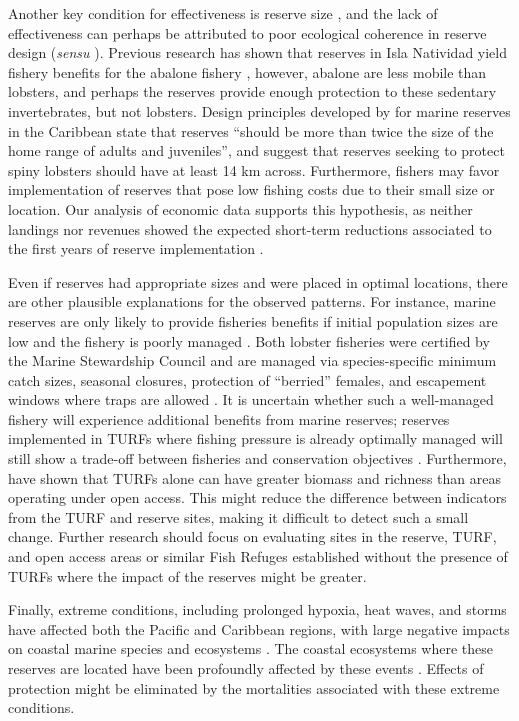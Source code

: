 \documentclass{frontiersSCNS}
\begin{document}
Another key condition for effectiveness is reserve size
\citep{edgar_2014-UO}, and the lack of effectiveness can perhaps be
attributed to poor ecological coherence in reserve design (\emph{sensu}
\citet{rees_2018}). Previous research has shown that reserves in Isla
Natividad yield fishery benefits for the abalone fishery
\citep{rossetto_2015-V0}, however, abalone are less mobile than
lobsters, and perhaps the reserves provide enough protection to these
sedentary invertebrates, but not lobsters. Design principles developed
by \citet{green_2017} for marine reserves in the Caribbean state that
reserves ``should be more than twice the size of the home range of
adults and juveniles'', and suggest that reserves seeking to protect
spiny lobsters should have at least 14 km across. Furthermore, fishers
may favor implementation of reserves that pose low fishing costs due to
their small size or location. Our analysis of economic data supports
this hypothesis, as neither landings nor revenues showed the expected
short-term reductions associated to the first years of reserve
implementation \citep{ovando_2016-Wg}.

Even if reserves had appropriate sizes and were placed in optimal
locations, there are other plausible explanations for the observed
patterns. For instance, marine reserves are only likely to provide
fisheries benefits if initial population sizes are low and the fishery
is poorly managed \citep{hilborn_2004,hilborn_2006}. Both lobster
fisheries were certified by the Marine Stewardship Council and are
managed via species-specific minimum catch sizes, seasonal closures,
protection of ``berried'' females, and escapement windows where traps
are allowed \citep{dof_website_1993}. It is uncertain whether such a
well-managed fishery will experience additional benefits from marine
reserves; reserves implemented in TURFs where fishing pressure is
already optimally managed will still show a trade-off between fisheries
and conservation objectives \citep{lester_2017}. Furthermore,
\citet{gelcich_2008} have shown that TURFs alone can have greater
biomass and richness than areas operating under open access. This might
reduce the difference between indicators from the TURF and reserve
sites, making it difficult to detect such a small change. Further
research should focus on evaluating sites in the reserve, TURF, and open
access areas or similar Fish Refuges established without the presence of
TURFs where the impact of the reserves might be greater.

Finally, extreme conditions, including prolonged hypoxia, heat waves,
and storms have affected both the Pacific and Caribbean regions, with
large negative impacts on coastal marine species and ecosystems
\citep{cavole_2016,hughes_2018,breitburg_2018}. The coastal ecosystems
where these reserves are located have been profoundly affected by these
events \citep{micheli_2012-EU,woodson_2018}. Effects of protection might
be eliminated by the mortalities associated with these extreme
conditions.
\end{document}
